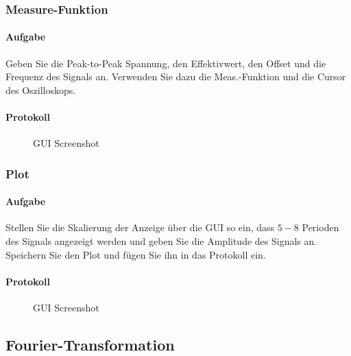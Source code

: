 \documentclass[10pt]{report}
\begin{document}
        \subsubsection{Measure-Funktion}
        \paragraph{Aufgabe}
        Geben Sie die Peak-to-Peak Spannung, den Effektivwert, den Offset und die Frequenz
        des Signals an. Verwenden Sie dazu die \glqq{}Meas.\grqq-{}Funktion und die Cursor des
        Oszilloskops.
        \paragraph{Protokoll}
        \begin{center}
            \begin{figure}[H]
              \caption{GUI Screenshot}
            \end{figure}
        \end{center}

        \subsubsection{Plot}
        \paragraph{Aufgabe}
        Stellen Sie die Skalierung der Anzeige über die GUI so ein, dass $5 - 8$ Perioden des
        Signals angezeigt werden und geben Sie die Amplitude des Signals an. Speichern
        Sie den Plot und fügen Sie ihn in das Protokoll ein.
        \paragraph{Protokoll}
        \begin{center}
            \begin{figure}[H]
              \caption{GUI Screenshot}
            \end{figure}
        \end{center}

        \subsection{Fourier-Transformation}
\end{document}
